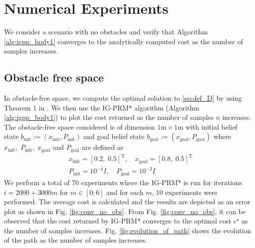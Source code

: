 \documentclass[Afour,sageh,times]{sagej}
\begin{document}
\section{Numerical Experiments}
\label{sec:experiments}
We consider a scenario with no obstacles and verify that Algorithm \ref{alg:igpp_body1} converges to the analytically computed cost as the number of samples increases. 
\subsection{Obstacle free space}
In obstacle-free space, we compute the optimal solution to \eqref{eq:def_D} by using Theorem 1 in \cite{pedram2021gaussian}. We then use the IG-PRM* algorithm (Algorithm \ref{alg:igpp_body1}) to plot the cost returned as the number of samples $n$ increases. The obstacle-free space considered is of dimension $1\mathrm{m}\times1\mathrm{m}$ with initial belief state $b_{\text{init}}:=(x_{\text{init}},P_{\text{init}})$ and goal belief state $b_{\text{goal}}:=(x_{\text{goal}},P_{\text{goal}})$ where $x_{\text{init}},\;P_{\text{init}},\;x_{\text{goal}}$ and $P_{\text{goal}}$ are defined as 
\begin{align}
    &x_{\text{init}}=[0.2,\;0.5]^\mathrm{T},\quad x_{\text{goal}}=[0.8,\;0.5]^\mathrm{T}\nonumber\\
    &P_{\text{init}}=10^{-4}I,\quad P_{\text{goal}}=10^{-3}I\nonumber
\end{align}
We perform a total of 70 experiments where the IG-PRM* is run for iterations $i=2000+3000m$ for $m\in[0;6]$ and for each $m$, 10 experiments were performed. The average cost is calculated and the results are depicted as an error plot as shown in Fig. \ref{fig:conv_no_obs}. From Fig. \ref{fig:conv_no_obs}, it can be observed that the cost returned by IG-PRM* converges to the optimal cost $c^\star$ as the number of samples increases. Fig. \ref{fig:evolution_of_path} shows the evolution of the path as the number of samples increases. 

\end{document}
